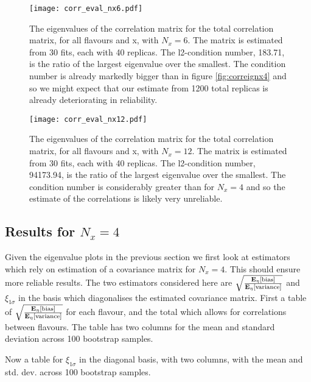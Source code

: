 \begin{figure}[]
    \centering
    \texttt{[image: corr\_eval\_nx6.pdf]}
    \caption{The eigenvalues of the correlation matrix for the total correlation
    matrix, for all flavours and x, with $N_x=6$. The matrix is estimated from
    30 fits, each with 40 replicas.
    The l2-condition number, 183.71, is the ratio of the
    largest eigenvalue over the smallest. The condition number is already markedly
    bigger than in figure \ref{fig:correignx4} and so we might expect that
    our estimate from 1200 total replicas is already deteriorating in reliability.}
    \label{fig:correignx6}
\end{figure}

\begin{figure}[]
    \centering
    \texttt{[image: corr\_eval\_nx12.pdf]}
    \caption{The eigenvalues of the correlation matrix for the total correlation
    matrix, for all flavours and x, with $N_x=12$. The matrix is estimated from
    30 fits, each with 40 replicas.
    The l2-condition number, 94173.94, is the ratio of the
    largest eigenvalue over the smallest. The condition number is considerably
    greater than for $N_x=4$ and so the estimate of the correlations is likely
    very unreliable.}
    \label{fig:correignx12}
\end{figure}

\subsection{Results for $N_x=4$}

Given the eigenvalue plots in the previous section we first look at estimators
which rely on estimation of a covariance matrix for $N_x=4$. This should ensure
more reliable results. The two estimators considered here are
$\sqrt{\frac{\mathbf{E}_{\eta}\left[ {\rm bias} \right]}{\mathbf{E}_{\eta}\left[ {\rm variance} \right]}}$ and $\xi_{1\sigma}$ in the basis
which diagonalises the estimated covariance matrix. First a table of
$\sqrt{\frac{\mathbf{E}_{\eta}\left[ {\rm bias} \right]}{\mathbf{E}_{\eta}\left[ {\rm variance} \right]}}$ for each flavour, and the total
which allows for correlations between flavours. The table has two columns
for the mean and standard deviation across 100 bootstrap samples.



Now a table for $\xi_{1\sigma}$ in the diagonal basis, with two columns, with the
mean and std. dev. across 100 bootstrap samples.



